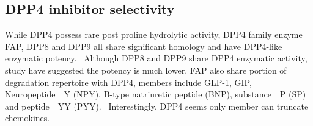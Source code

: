 \subsection{DPP4 inhibitor selectivity}
While DPP4 possess rare post proline hydrolytic activity, DPP4 family enzyme FAP, DPP8 and DPP9 all share significant homology and have DPP4-like enzymatic potency.~\cite{Kirby_2010,Thornberry_2007} Although DPP8 and DPP9 share DPP4 enzymatic activity, study have suggested the potency is much lower. FAP also share portion of degradation repertoire with DPP4, members include GLP-1, GIP, Neuropeptide Y (NPY), B-type natriuretic peptide (BNP), substance P (SP) and peptide YY (PYY).~\cite{Keane_2011} Interestingly, DPP4 seems only member can truncate chemokines.  
